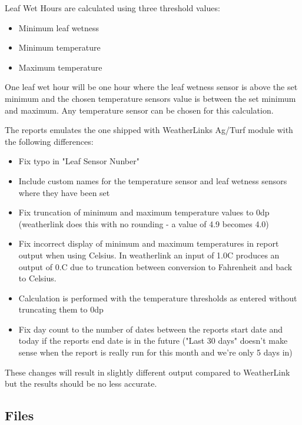 \documentclass[a4paper,10pt]{book}
\begin{document}
Leaf Wet Hours are calculated using three threshold values:
\begin{itemize}
\item Minimum leaf wetness
\item Minimum temperature
\item Maximum temperature
\end{itemize}

One leaf wet hour will be one hour where the leaf wetness sensor is above the set minimum and the chosen temperature sensors value is between the set minimum and maximum. Any temperature sensor can be chosen for this calculation.

The reports emulates the one shipped with WeatherLinks Ag/Turf module with the following differences:
\begin{itemize}
\item Fix typo in "Leaf Sensor Nunber"
\item Include custom names for the temperature sensor and leaf wetness sensors where they have been set
\item Fix truncation of minimum and maximum temperature values to 0dp (weatherlink does this with no rounding - a value of 4.9 becomes 4.0)
\item Fix incorrect display of minimum and maximum temperatures in report output when using Celsius. In weatherlink an input of 1.0\degree C produces an output of 0.\degree C due to truncation between conversion to Fahrenheit and back to Celsius.
\item Calculation is performed with the temperature thresholds as entered without truncating them to 0dp
\item Fix day count to the number of dates between the reports start date and today if the reports end date is in the future ("Last 30 days" doesn't make sense when the report is really run for this month and we're only 5 days in)
\end{itemize}

These changes will result in slightly different output compared to WeatherLink but the results should be no less accurate.

\subsection{Files}
\end{document}
